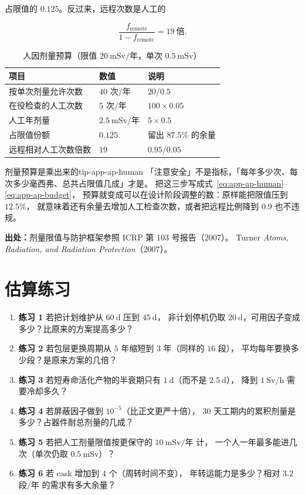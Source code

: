 占限值的 $0.125$。反过来，远程次数是人工的

\begin{equation}
\frac{f_{\text{remote}}}{1 - f_{\text{remote}}} = 19\ \text{倍}.
\label{eq:app-ap-turns}
\end{equation}

\begin{table}[htbp]
\centering
\small
\caption{人因剂量预算（限值 $20\ \mathrm{mSv}/$年，单次 $0.5\ \mathrm{mSv}$）}
\label{tab:app-ap-human}
\setlength{\tabcolsep}{4pt}
\begin{tabular}{p{5.8cm}p{4.2cm}p{5.6cm}}
\toprule
项目 & 数值 & 说明 \\
\midrule
按单次剂量允许次数 & $40$ 次$/$年 & $20/0.5$ \\
在役检查的人工次数 & $5$ 次$/$年 & $100 \times 0.05$ \\
人工年剂量 & $2.5\ \mathrm{mSv}/$年 & $5 \times 0.5$ \\
占限值份额 & $0.125$ & 留出 $87.5\%$ 的余量 \\
远程相对人工次数倍数 & $19$ & $0.95/0.05$ \\
\bottomrule
\end{tabular}
\end{table}

\begin{tip}{剂量预算是乘出来的}{tip-app-ap-human}
「注意安全」不是指标，「每年多少次、每次多少毫西弗、总共占限值几成」才是。
把这三步写成式~\eqref{eq:app-ap-human}--\eqref{eq:app-ap-budget}，
预算就变成可以在设计阶段调整的数：原样能把限值压到 $12.5\%$，
就意味着还有余量去增加人工检查次数，或者把远程比例降到 $0.9$ 也不违规。
\end{tip}

{\footnotesize
\textbf{出处：}剂量限值与防护框架参照 ICRP 第 103 号报告（2007）。
Turner \textit{Atoms, Radiation, and Radiation Protection}（2007）。
}

\section{估算练习}
\label{sec:app-ap-problems}

\begin{enumerate}
\item \textbf{练习 1} 若把计划维护从 $60\ \mathrm{d}$ 压到 $45\ \mathrm{d}$，
非计划停机仍取 $20\ \mathrm{d}$，可用因子变成多少？比原来的方案提高多少？
\item \textbf{练习 2} 若包层更换周期从 $5$ 年缩短到 $3$ 年（同样的 $16$ 段），
平均每年要换多少段？是原来方案的几倍？
\item \textbf{练习 3} 若短寿命活化产物的半衰期只有 $1\ \mathrm{d}$（而不是 $2.5\ \mathrm{d}$），
降到 $1\ \mathrm{Sv}/\mathrm{h}$ 需要冷却多久？
\item \textbf{练习 4} 若屏蔽因子做到 $10^{-5}$（比正文更严十倍），
$30$ 天工期内的累积剂量是多少？占器件耐总剂量的几成？
\item \textbf{练习 5} 若把人工剂量限值按更保守的 $10\ \mathrm{mSv}/$年 计，
一个人一年最多能进几次（单次仍取 $0.5\ \mathrm{mSv}$）？
\item \textbf{练习 6} 若 cask 增加到 $4$ 个（周转时间不变），
年转运能力是多少？相对 $3.2$ 段$/$年 的需求有多大余量？
\end{enumerate}

